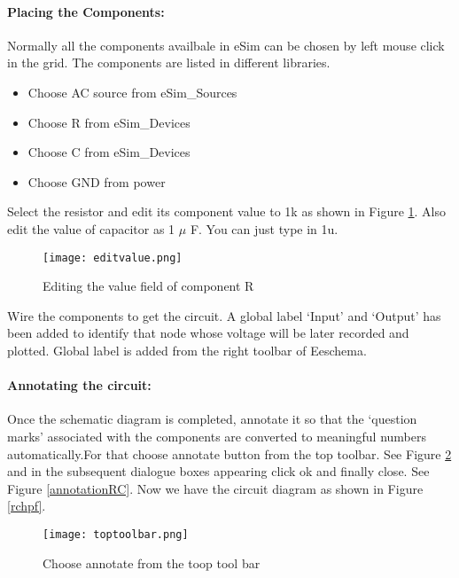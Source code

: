 \paragraph{Placing the Components:} Normally all the components availbale in eSim can be chosen by left mouse click in the grid. The components are listed in different libraries. %


\begin{itemize}
\item
Choose AC source from eSim\_Sources
\item
Choose R from eSim\_Devices
\item
Choose C from eSim\_Devices
\item
Choose GND from power
\end{itemize}

Select the resistor and edit its component value to 1k as shown in Figure \ref{editvalueR}. Also edit the value of capacitor as 1 $\mu$ F. You can just type in 1u.

\begin{figure}[h]
\centering
\texttt{[image: editvalue.png]}
\caption{Editing the value field of component R}
\label{editvalueR}
\end{figure}

Wire the components to get the circuit. A global label `Input'  and `Output' has been added to identify that node whose voltage will be later recorded and plotted. Global label is added from the right toolbar of Eeschema.

\paragraph{Annotating the circuit:} Once the schematic diagram is completed, annotate it so that the `question marks' associated with the components are converted to meaningful numbers automatically.For that choose annotate button from the top toolbar. See Figure \ref{toptoolbarRC} and in the subsequent dialogue boxes appearing click ok and finally close. See Figure \ref{annotationRC}. Now we have the circuit diagram as shown in Figure \ref{rchpf}.


\begin{figure}[H]
\centering
\texttt{[image: toptoolbar.png]}
\caption{Choose annotate from the toop tool bar}
\label{toptoolbarRC}
\end{figure}





